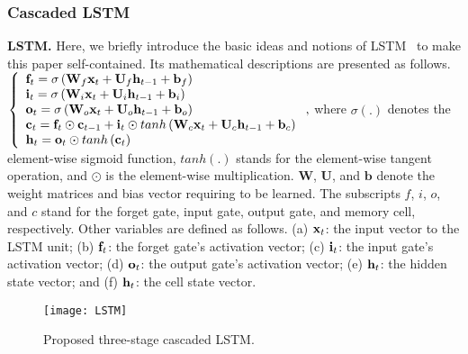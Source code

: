 \documentclass[10pt,twocolumn,letterpaper]{article}
\begin{document}
\subsubsection{Cascaded LSTM}
\vspace{-2mm}
\noindent \textbf{LSTM.} Here, we briefly introduce the basic ideas and notions of
LSTM~\cite{LSTM} to make this paper self-contained.
Its mathematical descriptions are presented as follows.\\
$\left\{ \begin{array}{l}
 {{\bf{f}}_t} = \sigma \left( {{{\bf{W}}_f}{{\bf{x}}_t} + {{\bf{U}}_f}{{\bf{h}}_{t - 1}} + {{\bf{b}}_f}} \right) \\
 {{\bf{i}}_t} = \sigma \left( {{{\bf{W}}_i}{{\bf{x}}_t} + {{\bf{U}}_i}{{\bf{h}}_{t - 1}} + {{\bf{b}}_i}} \right) \\
 {{\bf{o}}_t} = \sigma \left( {{{\bf{W}}_o}{{\bf{x}}_t} + {{\bf{U}}_o}{{\bf{h}}_{t - 1}} + {{\bf{b}}_o}} \right) \\
 {{\bf{c}}_t} = {{\bf{f}}_t} \odot {{\bf{c}}_{t - 1}} + {{\bf{i}}_t} \odot tanh\left( {{{\bf{W}}_c}{{\bf{x}}_t} + {{\bf{U}}_c}{{\bf{h}}_{t - 1}} + {{\bf{b}}_c}} \right) \\
 {{\bf{h}}_t} = {{\bf{o}}_t} \odot tanh\left( {{{\bf{c}}_t}} \right) \\
 \end{array} \right., $
where $\sigma \left( . \right)$ denotes the element-wise sigmoid function,
$tanh\left( . \right)$ stands for the element-wise tangent operation,
and $\odot$ is the element-wise multiplication.
$\mathbf{W}$, $\mathbf{U}$, and $\mathbf{b}$ denote the weight matrices and bias vector
requiring to be learned. The subscripts $f$, $i$, $o$, and $c$ stand for the forget gate, input
gate, output gate, and memory cell, respectively.
Other variables are defined as follows.
(a) ${{{\bf{x}}_t}}$: the input vector to the LSTM unit;
(b) ${{\bf{f}}_t}$: the forget gate's activation vector;
(c) ${{\bf{i}}_t}$: the input gate's activation vector;
(d) ${{\bf{o}}_t}$: the output gate's activation vector;
(e) ${{\bf{h}}_t}$: the hidden state vector;
and (f) ${{\bf{h}}_t}$: the cell state vector.

\begin{figure}[!t]
	\begin{center}
		\texttt{[image: LSTM]}
	\end{center}
	\vspace{-4mm}
	\caption{Proposed three-stage cascaded LSTM.}
	\label{fig-lstm}
	\vspace{-4mm}
\end{figure}
\end{document}

